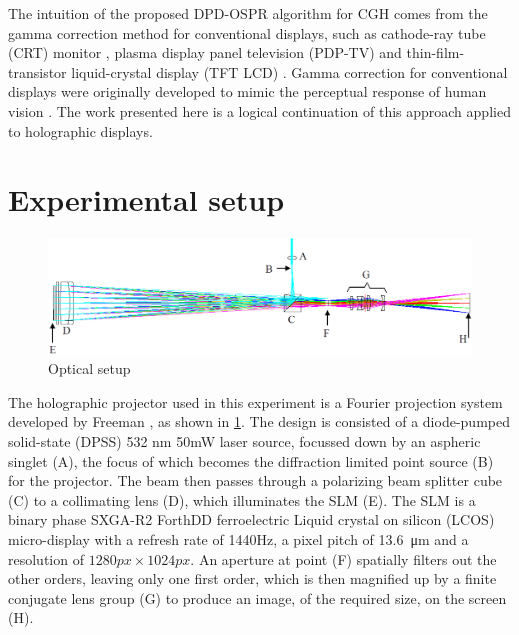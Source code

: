 The intuition of the proposed DPD-OSPR algorithm for CGH comes from the gamma correction method for conventional displays, such as cathode-ray tube (CRT) monitor \cite{Xu2009}, plasma display panel television (PDP-TV) \cite{Sung2009} and thin-film-transistor liquid-crystal display (TFT LCD) \cite{Lee2005,Prraga2014}. Gamma correction for conventional displays were originally developed to mimic the perceptual response of human vision \cite{Poynton2012}. The work presented here is a logical continuation of this approach applied to holographic displays.




\section{Experimental setup} \label{sec:experimental setup}

\begin{figure}[H]
    \centering
    \includegraphics[width=\textwidth]{projection_setup.png}
    \caption{Optical setup \cite{Freeman2009}}
    \label{fig:projection_setup}
\end{figure}

The holographic projector used in this experiment is a Fourier projection system developed by Freeman \cite{Freeman2009}, as shown in \cref{fig:projection_setup}. The design is consisted of a diode-pumped solid-state (DPSS) 532 nm 50mW laser source, focussed down by an aspheric singlet (A), the focus of which becomes the diffraction limited point source (B) for the projector. The beam then passes through a polarizing beam splitter cube (C) to a collimating lens (D), which illuminates the SLM (E). The SLM is a binary phase SXGA-R2 ForthDD ferroelectric Liquid crystal on silicon (LCOS) micro-display with a refresh rate of 1440Hz, a pixel pitch of \SI{13.6}{\micro\metre} and a resolution of $1280px \times 1024px$. An aperture at point (F) spatially filters out the other orders, leaving only one first order, which is then magnified up by a finite conjugate lens group (G) to produce an image, of the required size, on the screen (H). \cite{Freeman2009}

